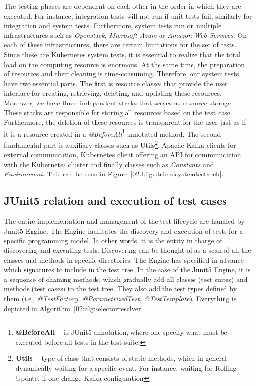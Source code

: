 The testing phases are dependent on each other in the order in which they are executed.
For instance, integration tests will not run if unit tests fail, similarly for integration and system tests.
Furthermore, system tests run on multiple infrastructures such as \emph{Openstack}, \emph{Microsoft Azure} or \emph{Amazon Web Services}.
On each of these infrastructures, there are certain limitations for the set of tests.
Since these are Kubernetes system tests, it is essential to realize that the total load on the computing resource is enormous.
At the same time, the preparation of resources and their cleaning is time-consuming.
Therefore, our system tests have two essential parts.
The first is resource classes that provide the user interface for creating, retrieving, deleting, and updating these resources.
Moreover, we have three independent stacks that serves as resource storage.
These stacks are responsible for storing all resources based on the test case.
Furthermore, the deletion of these resources is transparent for the user just as if it is a resource created in a \emph{@BeforeAll}\footnote{\textbf{@BeforeAll } \---\ is JUnit5 annotation, where one specify what must be executed before all tests in the test suite.} annotated method.
The second fundamental part is auxiliary classes such as Utils\footnote {\textbf{Utils} \---\ type of class that consists of static methods, which in general dynamically waiting for a specific event. For instance, waiting for Rolling Update, if one change Kafka configuration}, Apache Kafka clients for external communication, Kubernetes client offering an API for communication with the Kubernetes cluster and finally classes such as \emph{Constants} and \emph{Environment}. This can be seen in Figure~\ref{02d:fig:strimzisystemtestarch}.

\subsection{JUnit5 relation and execution of test cases}
\label{02:subsec:strimziJunit5relation:execution}

The entire implementation and management of the test lifecycle are handled by Junit5 Engine.
The Engine facilitates the discovery and execution of tests for a specific programming model.
In other words, it is the entity in charge of discovering and executing tests.
Discovering can be thought of as a scan of all the classes and methods in specific directories.
The Engine has specified in advance which signatures to include in the test tree.
In the case of the Junit5 Engine, it is a sequence of chaining methods, which gradually add all classes (test suites) and methods (test cases) to the test tree.
They also add the test types defined by them (i.e., \emph{@TestFactory}, \emph{@ParametrizedTest}, \emph{@TestTemplate}).
Everything is depicted in Algorithm~\ref{02:alg:selectorresolver}.

